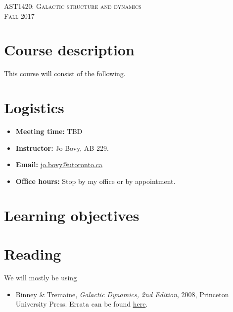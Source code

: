 \documentclass{article}
\begin{document}
\begin{center}
  \LARGE{\scshape{AST1420: Galactic structure and dynamics}}\\[5pt]
  \Large{\scshape{Fall 2017}}\\[25pt]
\end{center}

\section*{Course description}

This course will consist of the following.

\section*{Logistics}

\begin{itemize}

  \item {\bf Meeting time:} TBD

  \item {\bf Instructor:} Jo Bovy, AB 229.

  \item {\bf Email:} \href{mailto:jo.bovy@utoronto.ca}{jo.bovy@utoronto.ca}

  \item {\bf Office hours:} Stop by my office or by appointment.

\end{itemize}

\section*{Learning objectives}

\section*{Reading}

We will mostly be using

\begin{itemize}

  \item Binney \& Tremaine, \emph{Galactic Dynamics, 2nd Edition},
    2008, Princeton University Press. Errata can be found
    \href{https://www-thphys.physics.ox.ac.uk/people/JamesBinney/web/index\_files/BT2errors.pdf}{here}.

\end{itemize}
\end{document}
